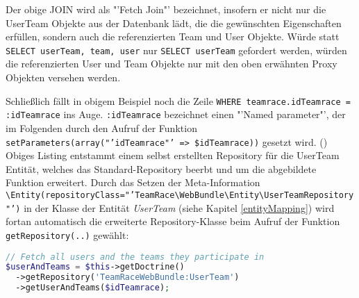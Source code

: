 \documentclass[12pt]{report}
\begin{document}
Der obige JOIN wird als "'Fetch Join"' bezeichnet, insofern er nicht nur die UserTeam Objekte aus der Datenbank lädt, die die gewünschten Eigenschaften erfüllen, sondern auch die referenzierten Team und User Objekte. Würde statt \texttt{SELECT userTeam, team, user} nur \texttt{SELECT userTeam} gefordert werden, würden die referenzierten User und Team Objekte nur mit den oben erwähnten Proxy Objekten versehen werden.

Schließlich fällt in obigem Beispiel noch die Zeile \texttt{WHERE teamrace.idTeamrace = :idTeamrace} ins Auge. \texttt{:idTeamrace} bezeichnet einen "'Named parameter"', der im Folgenden durch den Aufruf der Funktion \texttt{setParameters(array("'idTeamrace"' => \$idTeamrace))} gesetzt wird. (\cite{Doctrine:DQL})\\

Obiges Listing entstammt einem selbst erstellten Repository für die UserTeam Entität, welches das Standard-Repository beerbt und um die abgebildete Funktion erweitert. Durch das Setzen der Meta-Information \\
\texttt{\@ORM\textbackslash Entity(repositoryClass="'TeamRace\textbackslash WebBundle\textbackslash Entity\textbackslash UserTeamRepository"')} in der Klasse der Entität \emph{UserTeam} (siehe Kapitel \ref{entityMapping}) wird fortan automatisch die erweiterte Repository-Klasse beim Aufruf der Funktion \texttt{getRepository(..)} gewählt:
\begin{lstlisting}[language=php, caption=Auszug aus \\src/TeamRace/WebBundle/Controller/TeamraceController.php, showstringspaces=false]
// Fetch all users and the teams they participate in 
$userAndTeams = $this->getDoctrine()
  ->getRepository('TeamRaceWebBundle:UserTeam')
  ->getUserAndTeams($idTeamrace);
\end{lstlisting}
\end{document}
